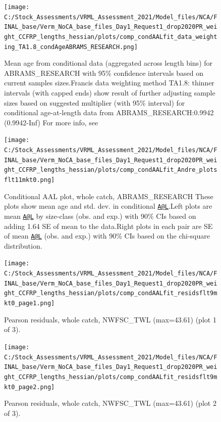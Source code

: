 \documentclass[11pt,
  english,
]{article}
\begin{document}
\begin{figure}
\centering
\texttt{[image: C:/Stock\_Assessments/VRML\_Assessment\_2021/Model\_files/NCA/FINAL\_base/Verm\_NoCA\_base\_files\_Day1\_Request1\_drop2020PR\_weight\_CCFRP\_lengths\_hessian/plots/comp\_condAALfit\_data\_weighting\_TA1.8\_condAgeABRAMS\_RESEARCH.png]}
\caption{Mean age from conditional data (aggregated across length bins) for ABRAMS\_RESEARCH with 95\% confidence intervals based on current samples sizes.Francis data weighting method TA1.8: thinner intervals (with capped ends) show result of further adjusting sample sizes based on suggested multiplier (with 95\% interval) for conditional age-at-length data from ABRAMS\_RESEARCH:0.9942 (0.9942-Inf) For more info, see}
\end{figure}

\begin{figure}
\centering
\texttt{[image: C:/Stock\_Assessments/VRML\_Assessment\_2021/Model\_files/NCA/FINAL\_base/Verm\_NoCA\_base\_files\_Day1\_Request1\_drop2020PR\_weight\_CCFRP\_lengths\_hessian/plots/comp\_condAALfit\_Andre\_plotsflt11mkt0.png]}
\caption{Conditional AAL plot, whole catch, ABRAMS\_RESEARCH These plots show mean age and std. dev. in conditional {\href{mailto:A@L}{\nolinkurl{A@L}}\leavevmode\tagmcend\tagstructend}.Left plots are mean {\href{mailto:A@L}{\nolinkurl{A@L}}\leavevmode\tagmcend\tagstructend} by size-class (obs. and exp.) with 90\% CIs based on adding 1.64 SE of mean to the data.Right plots in each pair are SE of mean {\href{mailto:A@L}{\nolinkurl{A@L}}\leavevmode\tagmcend\tagstructend} (obs. and exp.) with 90\% CIs based on the chi-square distribution.\label{fig:comp_condAALfit_Andre_plotsflt11mkt0}}
\end{figure}

\begin{figure}
\centering
\texttt{[image: C:/Stock\_Assessments/VRML\_Assessment\_2021/Model\_files/NCA/FINAL\_base/Verm\_NoCA\_base\_files\_Day1\_Request1\_drop2020PR\_weight\_CCFRP\_lengths\_hessian/plots/comp\_condAALfit\_residsflt9mkt0\_page1.png]}
\caption{Pearson residuals, whole catch, NWFSC\_TWL (max=43.61) (plot 1 of 3).\label{fig:comp_condAALfit_residsflt9mkt0_page1}}
\end{figure}

\begin{figure}
\centering
\texttt{[image: C:/Stock\_Assessments/VRML\_Assessment\_2021/Model\_files/NCA/FINAL\_base/Verm\_NoCA\_base\_files\_Day1\_Request1\_drop2020PR\_weight\_CCFRP\_lengths\_hessian/plots/comp\_condAALfit\_residsflt9mkt0\_page2.png]}
\caption{Pearson residuals, whole catch, NWFSC\_TWL (max=43.61) (plot 2 of 3).\label{fig:comp_condAALfit_residsflt9mkt0_page2}}
\end{figure}
\end{document}
